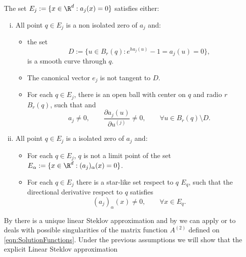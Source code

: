 \begin{hypothesis} \label{ass:HypThmSingularities}
	The set $E_j:=\{x\in \R^{d}: a_j(x)=0\}$ satisfies either:
	\begin{enumerate}[(i)]
		\item
			All point $q \in E_j$ is a non isolated zero of $a_j$ and:
			\begin{itemize}
				\item the set 
					$$
						D:=\{u \in B_r(q): e^{ha_j(u)}-1=a_j(u)= 0\},
					$$ 
					is a smooth curve through $q$. 
				\item
					The canonical vector $e_j$ is not
					tangent to $D$.
				\item
					For each $q \in E_j$, there is an open ball with center
					on $q$ and radio $r$ $B_r(q)$, such that  
					and
					$$
						a_j\neq 0, \qquad
						\frac{\partial a_j(u)}{\partial u^{(j)}} \neq 0 ,\qquad 
						\forall u \in B_r(q)
						\setminus D.
					$$	
			\end{itemize}	
		\item
			All point $q \in E_j$ is a isolated zero of $a_j$ and:
			\begin{itemize}
				\item
					For each $q\in E_j$,  $q$ is not a limit point of the set 
					$E_{\alpha}:=\{x \in \R^d: (a_j)_\alpha(x)=0\}$.
				\item
					For each $q \in E_j$ there is a star-like set respect to $q$ $E_q$, such that
					the directional derivative respect to $q$ satisfies
					$$
						 (a_j)_\alpha(x) \neq 0, \qquad \forall x\in E_q.
					$$
			\end{itemize}		
	\end{enumerate}	
\end{hypothesis}
%
By  there is a unique linear Steklov approximation and by 
we can apply   or  to deals with possible singularities of the matrix function 
$A^{(2)}$ defined on \eqref{eqn:SolutionFunctions}. Under the previous  assumptions 
we will show that the explicit Linear  Steklov approximation 
